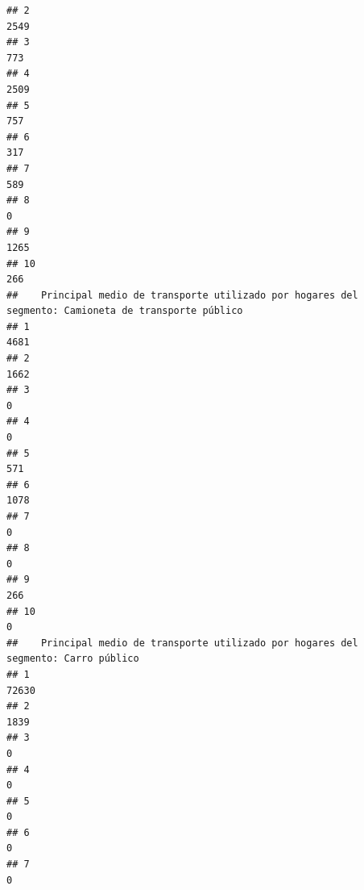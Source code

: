 \documentclass[11pt,]{article}
\begin{document}
\begin{verbatim}
## 2                                                                              2549
## 3                                                                               773
## 4                                                                              2509
## 5                                                                               757
## 6                                                                               317
## 7                                                                               589
## 8                                                                                 0
## 9                                                                              1265
## 10                                                                              266
##    Principal medio de transporte utilizado por hogares del segmento: Camioneta de transporte público
## 1                                                                                               4681
## 2                                                                                               1662
## 3                                                                                                  0
## 4                                                                                                  0
## 5                                                                                                571
## 6                                                                                               1078
## 7                                                                                                  0
## 8                                                                                                  0
## 9                                                                                                266
## 10                                                                                                 0
##    Principal medio de transporte utilizado por hogares del segmento: Carro público
## 1                                                                            72630
## 2                                                                             1839
## 3                                                                                0
## 4                                                                                0
## 5                                                                                0
## 6                                                                                0
## 7                                                                                0

\end{verbatim}
\end{document}
